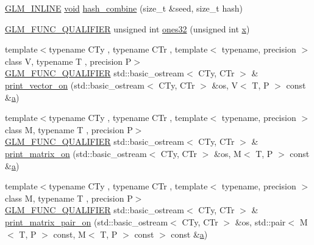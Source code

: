 \begin{DoxyCompactItemize}
\item 
\mbox{\hyperlink{setup_8hpp_a4603970cbd724c5d102bbcf17f430047}{G\+L\+M\+\_\+\+I\+N\+L\+I\+NE}} \mbox{\hyperlink{glad_8h_a950fc91edb4504f62f1c577bf4727c29}{void}} \mbox{\hyperlink{namespaceglm_1_1detail_a391b3eb8d7f4662a1b31046bd69f2755}{hash\+\_\+combine}} (size\+\_\+t \&seed, size\+\_\+t hash)
\item 
\mbox{\hyperlink{setup_8hpp_a33fdea6f91c5f834105f7415e2a64407}{G\+L\+M\+\_\+\+F\+U\+N\+C\+\_\+\+Q\+U\+A\+L\+I\+F\+I\+ER}} unsigned int \mbox{\hyperlink{namespaceglm_1_1detail_a2699e3b3ea6ad8d4bb99aed56761582c}{ones32}} (unsigned int \mbox{\hyperlink{glad_8h_a92d0386e5c19fb81ea88c9f99644ab1d}{x}})
\item 
{\footnotesize template$<$typename C\+Ty , typename C\+Tr , template$<$ typename, precision $>$ class V, typename T , precision P$>$ }\\\mbox{\hyperlink{setup_8hpp_a33fdea6f91c5f834105f7415e2a64407}{G\+L\+M\+\_\+\+F\+U\+N\+C\+\_\+\+Q\+U\+A\+L\+I\+F\+I\+ER}} std\+::basic\+\_\+ostream$<$ C\+Ty, C\+Tr $>$ \& \mbox{\hyperlink{namespaceglm_1_1detail_a96bee64577b69e3a541b02df0f591cc1}{print\+\_\+vector\+\_\+on}} (std\+::basic\+\_\+ostream$<$ C\+Ty, C\+Tr $>$ \&os, V$<$ T, P $>$ const \&\mbox{\hyperlink{glad_8h_ac8729153468b5dcf13f971b21d84d4e5}{a}})
\item 
{\footnotesize template$<$typename C\+Ty , typename C\+Tr , template$<$ typename, precision $>$ class M, typename T , precision P$>$ }\\\mbox{\hyperlink{setup_8hpp_a33fdea6f91c5f834105f7415e2a64407}{G\+L\+M\+\_\+\+F\+U\+N\+C\+\_\+\+Q\+U\+A\+L\+I\+F\+I\+ER}} std\+::basic\+\_\+ostream$<$ C\+Ty, C\+Tr $>$ \& \mbox{\hyperlink{namespaceglm_1_1detail_a705becbf05df4c8637731f85569fc0e6}{print\+\_\+matrix\+\_\+on}} (std\+::basic\+\_\+ostream$<$ C\+Ty, C\+Tr $>$ \&os, M$<$ T, P $>$ const \&\mbox{\hyperlink{glad_8h_ac8729153468b5dcf13f971b21d84d4e5}{a}})
\item 
{\footnotesize template$<$typename C\+Ty , typename C\+Tr , template$<$ typename, precision $>$ class M, typename T , precision P$>$ }\\\mbox{\hyperlink{setup_8hpp_a33fdea6f91c5f834105f7415e2a64407}{G\+L\+M\+\_\+\+F\+U\+N\+C\+\_\+\+Q\+U\+A\+L\+I\+F\+I\+ER}} std\+::basic\+\_\+ostream$<$ C\+Ty, C\+Tr $>$ \& \mbox{\hyperlink{namespaceglm_1_1detail_aff6c8f1c43115431bf40167f6638b78f}{print\+\_\+matrix\+\_\+pair\+\_\+on}} (std\+::basic\+\_\+ostream$<$ C\+Ty, C\+Tr $>$ \&os, std\+::pair$<$ M$<$ T, P $>$ const, M$<$ T, P $>$ const $>$ const \&\mbox{\hyperlink{glad_8h_ac8729153468b5dcf13f971b21d84d4e5}{a}})

\end{DoxyCompactItemize}
